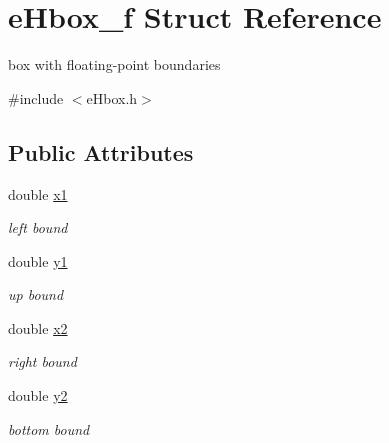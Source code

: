 \hypertarget{structeHbox__f}{\section{e\-Hbox\-\_\-f Struct Reference}
\label{structeHbox__f}
}


box with floating-\/point boundaries  




{\ttfamily \#include $<$e\-Hbox.\-h$>$}

\subsection*{Public Attributes}
\begin{DoxyCompactItemize}
\item 
\hypertarget{structeHbox__f_af3126f4d69a822e5ca0c7f5ebaf19a7c}{double \hyperlink{structeHbox__f_af3126f4d69a822e5ca0c7f5ebaf19a7c}{x1}}\label{structeHbox__f_af3126f4d69a822e5ca0c7f5ebaf19a7c}

\begin{DoxyCompactList}\small\item\em left bound \end{DoxyCompactList}\item 
\hypertarget{structeHbox__f_a939eb86ee05d47cd50ae8f84cdb86415}{double \hyperlink{structeHbox__f_a939eb86ee05d47cd50ae8f84cdb86415}{y1}}\label{structeHbox__f_a939eb86ee05d47cd50ae8f84cdb86415}

\begin{DoxyCompactList}\small\item\em up bound \end{DoxyCompactList}\item 
\hypertarget{structeHbox__f_ae0f6a80294db01175bd4cd4ec4bcc4d6}{double \hyperlink{structeHbox__f_ae0f6a80294db01175bd4cd4ec4bcc4d6}{x2}}\label{structeHbox__f_ae0f6a80294db01175bd4cd4ec4bcc4d6}

\begin{DoxyCompactList}\small\item\em right bound \end{DoxyCompactList}\item 
\hypertarget{structeHbox__f_a4a25cd8e2734fb6843f78861c25e5d69}{double \hyperlink{structeHbox__f_a4a25cd8e2734fb6843f78861c25e5d69}{y2}}\label{structeHbox__f_a4a25cd8e2734fb6843f78861c25e5d69}

\begin{DoxyCompactList}\small\item\em bottom bound \end{DoxyCompactList}\end{DoxyCompactItemize}


